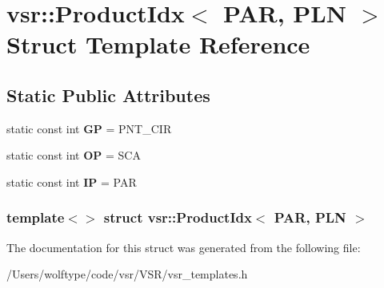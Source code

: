 \hypertarget{structvsr_1_1_product_idx_3_01_p_a_r_00_01_p_l_n_01_4}{\section{vsr\-:\-:Product\-Idx$<$ P\-A\-R, P\-L\-N $>$ Struct Template Reference}
\label{structvsr_1_1_product_idx_3_01_p_a_r_00_01_p_l_n_01_4}
}
\subsection*{Static Public Attributes}
\begin{DoxyCompactItemize}
\item 
\hypertarget{structvsr_1_1_product_idx_3_01_p_a_r_00_01_p_l_n_01_4_afc9a4b9aa9fc96d4105ad216170d6bd4}{static const int {\bfseries G\-P} = P\-N\-T\-\_\-\-C\-I\-R}\label{structvsr_1_1_product_idx_3_01_p_a_r_00_01_p_l_n_01_4_afc9a4b9aa9fc96d4105ad216170d6bd4}

\item 
\hypertarget{structvsr_1_1_product_idx_3_01_p_a_r_00_01_p_l_n_01_4_ace8caf12b5984f19959e2ac00ffe22c5}{static const int {\bfseries O\-P} = S\-C\-A}\label{structvsr_1_1_product_idx_3_01_p_a_r_00_01_p_l_n_01_4_ace8caf12b5984f19959e2ac00ffe22c5}

\item 
\hypertarget{structvsr_1_1_product_idx_3_01_p_a_r_00_01_p_l_n_01_4_af121684539f1f3834b9c49bbefab8b68}{static const int {\bfseries I\-P} = P\-A\-R}\label{structvsr_1_1_product_idx_3_01_p_a_r_00_01_p_l_n_01_4_af121684539f1f3834b9c49bbefab8b68}

\end{DoxyCompactItemize}
\subsubsection*{template$<$$>$ struct vsr\-::\-Product\-Idx$<$ P\-A\-R, P\-L\-N $>$}



The documentation for this struct was generated from the following file\-:\begin{DoxyCompactItemize}
\item 
/\-Users/wolftype/code/vsr/\-V\-S\-R/vsr\-\_\-templates.\-h\end{DoxyCompactItemize}
